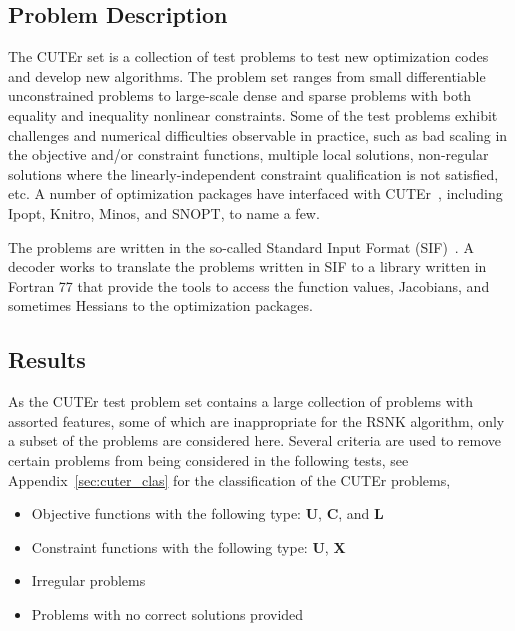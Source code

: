 \subsection{Problem Description}
The CUTEr set is a collection of 
test problems to test new optimization codes and develop new algorithms. The problem set ranges from small differentiable unconstrained problems to large-scale dense and sparse problems with both equality and inequality nonlinear constraints.
Some of the test problems exhibit challenges and numerical difficulties observable in practice, such as bad scaling in the objective and/or constraint functions, multiple local solutions, non-regular solutions where the linearly-independent constraint qualification is not satisfied, etc. A number of optimization packages have interfaced with CUTEr~\cite{cuter_interface}, including Ipopt, Knitro, Minos, and SNOPT, to name a few.

The problems are written in the so-called Standard Input Format (SIF)~\cite{Conn1992}. A decoder works to translate the problems written in SIF to a library written in Fortran 77 that provide the tools to access the function values, Jacobians, and sometimes Hessians to the optimization packages. %

\subsection{Results}
As the CUTEr test problem set contains a large collection of problems with assorted features, some of which are inappropriate for the RSNK algorithm, only a subset of the problems are considered here. Several criteria are used to remove certain problems from being considered in the following tests, see Appendix~\ref{sec:cuter_clas} for the classification of the CUTEr problems, 
\begin{itemize} \itemsep -8pt 
\item Objective functions with the following type: \textbf{U},  \textbf{C}, and \textbf{L}
\item Constraint functions with the following type: \textbf{U},  \textbf{X}
\item Irregular problems 
\item Problems with no correct solutions provided
\end{itemize}

